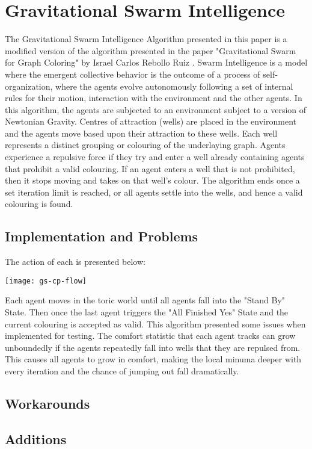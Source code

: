 \section{Gravitational Swarm Intelligence}
The Gravitational Swarm Intelligence Algorithm presented in this paper is a modified version of the algorithm presented in the paper "Gravitational Swarm for Graph Coloring" by Israel Carlos Rebollo Ruiz \cite{bib:GravSwarm}. Swarm Intelligence is a model where the emergent collective behavior is the outcome of a process of self-organization, where the agents evolve autonomously following a set of internal rules for their motion, interaction with the environment and the other agents. In this algorithm, the agents are subjected to an environment subject to a version of Newtonian Gravity. Centres of attraction (wells) are placed in the environment and the agents move based upon their attraction to these wells. Each well represents a distinct grouping or colouring of the underlaying graph. Agents experience a repulsive force if they try and enter a well already containing agents that prohibit a valid colouring. If an agent enters a well that is not prohibited, then it stops moving and takes on that well's colour. The algorithm ends once a set iteration limit is reached, or all agents settle into the wells, and hence a valid colouring is found.

\subsection{Implementation and Problems}
The action of each is presented below:
\begin{center}
\texttt{[image: gs-cp-flow]}
\end{center}
Each agent moves in the toric world until all agents fall into the "Stand By" State. Then once the last agent triggers the "All Finished \Rightarrow Yes" State and the current colouring is accepted as valid. This algorithm presented some issues when implemented for testing. The comfort statistic that each agent tracks can grow unboundedly if the agents repeatedly fall into wells that they are repulsed from. This causes all agents to grow in comfort, making the local minuma deeper with every iteration and the chance of jumping out fall dramatically. 

\subsection{Workarounds}
\subsection{Additions}